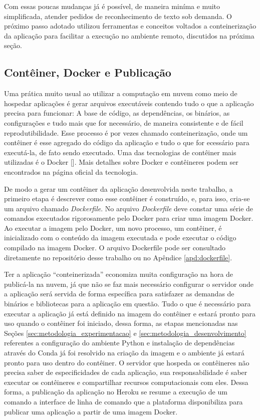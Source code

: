 Com essas poucas mudanças já é possível, de maneira miníma e muito simplificada, atender pedidos de reconhecimento de texto sob demanda. O próximo 
passo adotado utilizou ferramentas e conceitos voltados a conteinerização da aplicação para facilitar a execução no ambiente remoto, discutidos na 
próxima seção.

\subsection{Contêiner, Docker e Publicação}
Uma prática muito usual ao utilizar a computação em nuvem como meio de hospedar aplicações é gerar arquivos executáveis contendo tudo o que a aplicação 
precisa para funcionar: A base de código, as dependências, os binários, as configurações e tudo mais que for necessário, de maneira consistente e de 
fácil reprodutibilidade. Esse processo é por vezes chamado conteinerização, onde um contêiner é esse agregado do código da aplicação e tudo o que for 
ecessário para executá-la, de fato sendo executado. Uma das tecnologias de contêiner mais utilizadas é o Docker []. Mais detalhes 
sobre Docker e contêineres podem ser encontrados na página oficial da tecnologia.

De modo a gerar um contêiner da aplicação desenvolvida neste trabalho, a primeiro etapa é descrever como esse contêiner é construído, e, para isso, 
cria-se um arquivo chamado \textit{Dockerfile}. No arquivo \textit{Dockerfile} deve constar uma série de comandos executados rigorosamente pelo Docker 
para criar uma imagem Docker. Ao executar a imagem pelo Docker, um novo processo, um contêiner, é inicializado com o conteúdo da imagem executada e 
pode executar o código compilado na imagem Docker. O arquivo Dockerfile pode ser consultado diretamente no repositório desse trabalho ou no 
Apêndice \ref{apd:dockerfile}.

Ter a aplicação “conteinerizada” economiza muita configuração na hora de publicá-la na nuvem, já que não se faz mais necessário configurar o servidor 
onde a aplicação será servida de forma específica para satisfazer as demandas de binários e bibliotecas para a aplicação em questão. Tudo o que é 
necessário para executar a aplicação já está definido na imagem do contêiner e estará pronto para uso quando o contêiner foi iniciado, dessa forma, 
as etapas mencionadas nas Seções \ref{sec:metodologia_experimentacao} e \ref{sec:metodologia_desenvolvimento} referentes a configuração do ambiente 
Python e instalação de dependências através do Conda já foi resolvido na criação da imagem e o ambiente já estará pronto para uso dentro do contêiner. 
O servidor que hospeda os contêineres não precisa saber de especificidades de cada aplicação, sua responsabilidade é saber executar os contêineres e 
compartilhar recursos computacionais com eles. Dessa forma, a publicação da aplicação no Heroku se resume a execução de um comando a interface de linha 
de comando que a plataforma disponibiliza para publicar uma aplicação a partir de uma imagem Docker.

